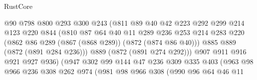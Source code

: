 \begin{lexlean}{RustCore}
\begin{coremodule}
                                @90
                                @798
                                @800
                                @293
                                @300
                                @243
                                (@811
                                  @89
                                  @40
                                  @42
                                  @223
                                  @292
                                  @299
                                  @214
                                  @123
                                  @220
                                  @844
                                  (@810
                                    @87
                                    @64
                                    @40
                                    @11
                                    @289
                                    @236
                                    @253
                                    @214
                                    @283
                                    @220
                                    (@862 @86 @289 (@867 (@868 @289)) (@872 (@874 @86 @40)))
                                    @885
                                    @889
                                    (@872 (@891 @284 @236)))
                                  @889
                                  (@872 (@891 @274 @292)))
                                @907
                                @911
                                @916
                                @921
                                @927
                                @936)
                              (@947
                                @302
                                @99
                                @144
                                @47
                                @236
                                @309
                                @335
                                @403
                                (@963
                                  @98
                                  @966
                                  @236
                                  @308
                                  @262
                                  @974
                                  (@981
                                    @98
                                    @966
                                    @308
                                    (@990
                                      @96
                                      @64
                                      @46
                                      @11

\end{coremodule}
\end{lexlean}
